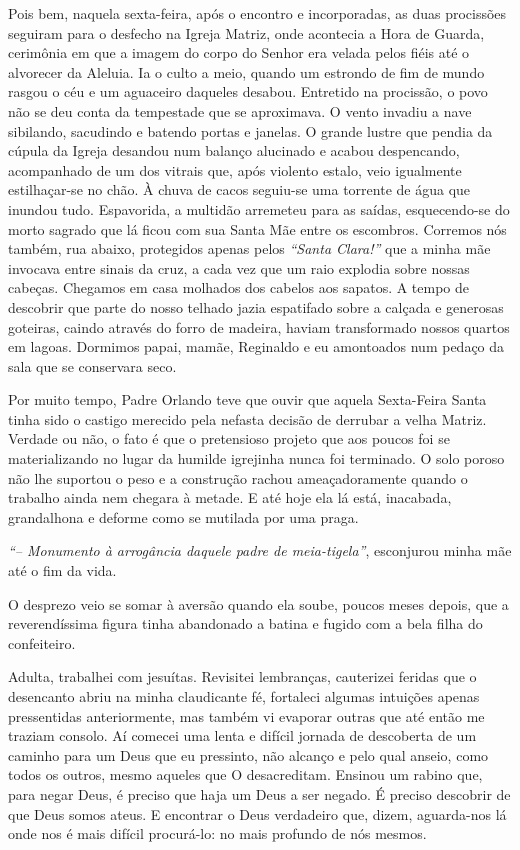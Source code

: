 Pois bem, naquela sexta-feira, após o encontro e incorporadas, as duas procissões seguiram para o desfecho na Igreja Matriz, onde acontecia a Hora de Guarda, cerimônia em que a imagem do corpo do Senhor era velada pelos fiéis até o alvorecer da Aleluia. 
Ia o culto a meio, quando um estrondo de fim de mundo rasgou o céu e um aguaceiro daqueles desabou. 
Entretido na procissão, o povo não se deu conta da tempestade que se aproximava. 
O vento invadiu a nave sibilando, sacudindo e batendo portas e janelas. 
O grande lustre que pendia da cúpula da Igreja desandou num balanço alucinado e acabou despencando, acompanhado de um dos vitrais que, após violento estalo, veio igualmente estilhaçar-se no chão. 
À chuva de cacos seguiu-se uma torrente de água que inundou tudo. 
Espavorida, a multidão arremeteu para as saídas, esquecendo-se do morto sagrado que lá ficou com sua Santa Mãe entre os escombros. 
Corremos nós também, rua abaixo, protegidos apenas pelos \textit{``Santa Clara!''} que a minha mãe invocava entre sinais da cruz, a cada vez que um raio explodia sobre nossas cabeças. 
Chegamos em casa molhados dos cabelos aos sapatos. 
A tempo de descobrir que parte do nosso telhado jazia espatifado sobre a calçada e generosas goteiras, caindo através do forro de madeira, haviam transformado nossos quartos em lagoas. 
Dormimos papai, mamãe, Reginaldo e eu amontoados num pedaço da sala que se conservara seco.

Por muito tempo, Padre Orlando teve que ouvir que aquela Sexta-Feira Santa tinha sido o castigo merecido pela nefasta decisão de derrubar a velha Matriz. 
Verdade ou não, o fato é que o pretensioso projeto que aos poucos foi se materializando no lugar da humilde igrejinha nunca foi terminado. 
O solo poroso não lhe suportou o peso e a construção rachou ameaçadoramente quando o trabalho ainda nem chegara à metade. 
E até hoje ela lá está, inacabada, grandalhona e deforme como se mutilada por uma praga. 

\textit{``-- Monumento à arrogância daquele padre de meia-tigela''}, esconjurou minha mãe até o fim da vida. 

O desprezo veio se somar à aversão quando ela soube, poucos meses depois, que a reverendíssima figura tinha abandonado a batina e fugido com a bela filha do confeiteiro.

Adulta, trabalhei com jesuítas. Revisitei lembranças, cauterizei feridas que o desencanto abriu na minha claudicante fé, fortaleci algumas intuições apenas pressentidas anteriormente, mas também vi evaporar outras que até então me traziam consolo. Aí comecei uma lenta e difícil jornada de descoberta de um caminho para um Deus que eu pressinto, não alcanço e pelo qual anseio, como todos os outros, mesmo aqueles que O desacreditam.  Ensinou um rabino que, para negar Deus, é preciso que haja um Deus a ser negado. É preciso descobrir de que Deus somos ateus. E encontrar o Deus verdadeiro que, dizem, aguarda-nos lá onde nos é mais difícil procurá-lo: no mais profundo de nós mesmos. 